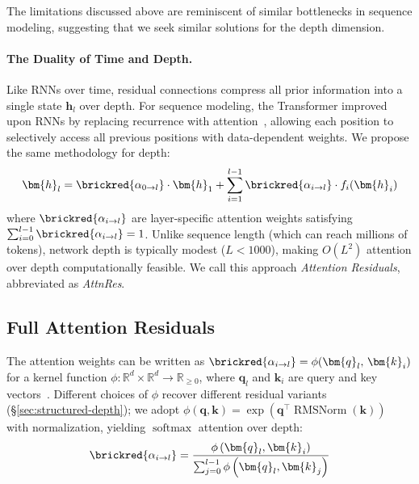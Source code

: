 The limitations discussed above are reminiscent of similar bottlenecks in sequence modeling, suggesting that we seek similar solutions for the depth dimension.

\paragraph{The Duality of Time and Depth.}
Like RNNs over time, residual connections compress all prior information into a single state $\bm{h}_l$ over depth.
For sequence modeling, the Transformer improved upon RNNs by replacing recurrence with attention~\citep{bahdanau2016attention,vaswani-2017-attention}, allowing each position to selectively access all previous positions with data-dependent weights.
We propose the same methodology for depth:
\begin{equation}
    \bm{h}_{l} = \brickred{\alpha_{0 \to l}} \cdot \bm{h}_1 + \sum_{i=1}^{l-1} \brickred{\alpha_{i \to l}} \cdot f_i(\bm{h}_{i})
\end{equation}
where $\brickred{\alpha_{i \to l}}$ are layer-specific attention weights satisfying $\sum_{i=0}^{l-1} \brickred{\alpha_{i \to l}} = 1$.
Unlike sequence length (which can reach millions of tokens), network depth is typically modest ($L < 1000$), making $O(L^2)$ attention over depth computationally feasible.
We call this approach \emph{Attention Residuals}, abbreviated as \emph{AttnRes}.

\subsection{Full Attention Residuals}
The attention weights can be written as $\brickred{\alpha_{i \to l}} = \phi(\bm{q}_{l},\, \bm{k}_{i})$ for a kernel function $\phi\colon \mathbb{R}^d \times \mathbb{R}^d \to \mathbb{R}_{\geq 0}$, where $\bm{q}_l$ and $\bm{k}_i$ are query and key vectors~\cite{katharopoulos-2020-transformers, zhong2025understanding}. Different choices of $\phi$ recover different residual variants (\S\ref{sec:structured-depth}); we adopt $\phi(\bm{q}, \bm{k}) = \exp\left(\bm{q}^\top\operatorname{RMSNorm}(\bm{k})\right)$~\cite{zhang2019root} with normalization, yielding $\operatorname{softmax}$ attention over depth:
\begin{equation}
    \label{eq:attn-weights}
    \brickred{\alpha_{i \to l}} = \frac{\phi\left(\bm{q}_{l}, \bm{k}_{i}\right)}{\sum_{j=0}^{l-1} \phi\left(\bm{q}_{l}, \bm{k}_{j}\right)}
\end{equation}


